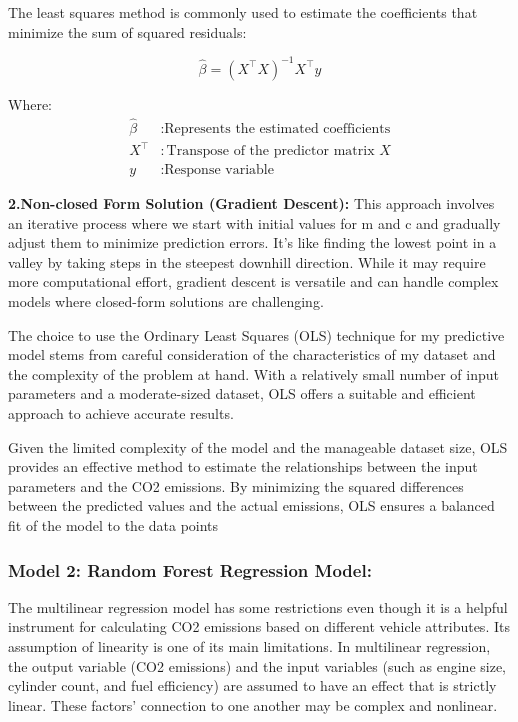 \documentclass[12pt, a4paper,oneside]{book}
\numberwithin{equation}{section}
\begin{document}
The least squares method is commonly used to estimate the coefficients that minimize the sum of squared residuals:

\[
\hat{\beta} = (X^\top X)^{-1} X^\top y
\]

Where:
\begin{align*}
\hat{\beta} &: \text{Represents the estimated coefficients} \\
X^\top &: \text{Transpose of the predictor matrix } X \\
y &: \text{Response variable}
\end{align*}


\textbf{ 2.Non-closed Form Solution (Gradient Descent):}
This approach involves an iterative process where we start with initial values for m and c and gradually adjust them to minimize prediction errors. It's like finding the lowest point in a valley by taking steps in the steepest downhill direction. While it may require more computational effort, gradient descent is versatile and can handle complex models where closed-form solutions are challenging.


The choice to use  the Ordinary Least Squares (OLS) technique for my predictive model stems from careful consideration of the characteristics of my dataset and the complexity of the problem at hand. With a relatively small number of input parameters and a moderate-sized dataset, OLS offers a suitable and efficient approach to achieve accurate results.

Given the limited complexity of the model and the manageable dataset size, OLS provides an effective method to estimate the relationships between the input parameters and the CO2 emissions. By minimizing the squared differences between the predicted values and the actual emissions, OLS ensures a balanced fit of the model to the data points


\subsubsection{Model 2: Random Forest Regression Model:
}The multilinear regression model has some restrictions even though it is a helpful instrument for calculating CO2 emissions based on different vehicle attributes. Its assumption of linearity is one of its main limitations. In multilinear regression, the output variable (CO2 emissions) and the input variables (such as engine size, cylinder count, and fuel efficiency) are assumed to have an effect that is strictly linear. These factors' connection to one another may be complex and nonlinear.
\end{document}
